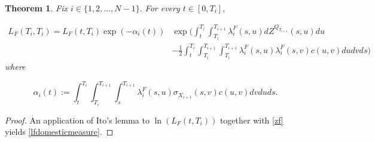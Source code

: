 \documentclass[11pt]{article}
\newtheorem{theorem}{Theorem}[section]
\begin{document}
\begin{theorem}
Fix $i\in \{1,2,...,N-1\}.$ For every $t\in [0,T_i],$







\begin{equation}\label{lfdomesticmeasure}
     \begin{split}
        L_F(T_i,T_i)=L_F(t,T_i)\exp(-\alpha_i(t))&\exp\Bigg(
        \int_t^{T_i}\int_{T_i}^{T_{i+1}}\lambda_i^F(s,u)dZ^{Q_{T_{i+1}}}(s,u)du\\
        &-\frac{1}{2}\int_t^{T_i}\int_{T_i}^{T_{i+1}}\int_{T_i}^{T_{i+1}}\lambda_i^F(s,u)\lambda_i^F(s,v)c(u,v)dudvds\Bigg)
    \end{split}
\end{equation}
where

\begin{equation}\label{alpha}
    \alpha_i(t):=\int_t^{T_i}\int_{T_i}^{T_{i+1}}\int_{s}^{T_{i+1}}\lambda_i^F(s,u)\sigma_{X_{i+1}}(s,v)c(u,v)dvduds.
\end{equation}
\end{theorem}

\begin{proof}
An application of Ito's lemma to $\ln (L_F(t,T_i))$ together with \eqref{zf} yields \eqref{lfdomesticmeasure}.
\end{proof}


\end{document}
